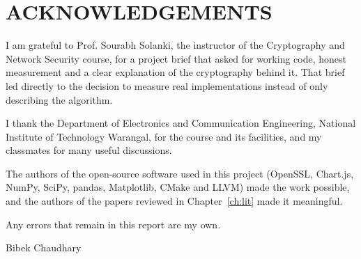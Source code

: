 \chapter*{\normalsize ACKNOWLEDGEMENTS}

I am grateful to Prof. Sourabh Solanki, the instructor of the Cryptography and Network Security course, for a project brief that asked for working code, honest measurement and a clear explanation of the cryptography behind it. That brief led directly to the decision to measure real implementations instead of only describing the algorithm.

I thank the Department of Electronics and Communication Engineering, National Institute of Technology Warangal, for the course and its facilities, and my classmates for many useful discussions.

The authors of the open-source software used in this project (OpenSSL, Chart.js, NumPy, SciPy, pandas, Matplotlib, CMake and LLVM) made the work possible, and the authors of the papers reviewed in Chapter~\ref{ch:lit} made it meaningful.

Any errors that remain in this report are my own.

\vspace{1.5cm}
\begin{flushright}
Bibek Chaudhary
\end{flushright}
\clearpage
